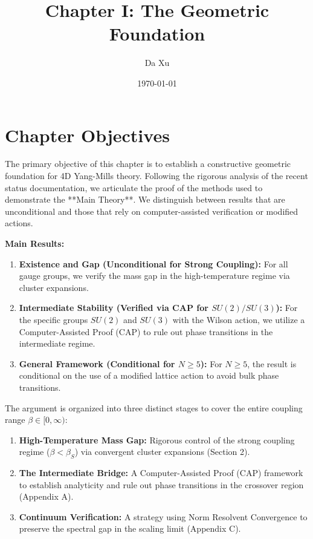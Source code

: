 \documentclass[11pt,a4paper]{report}
\title{Chapter I: The Geometric Foundation}
\author{Da Xu}
\date{\today}
\begin{document}
\maketitle

\chapter*{Chapter Objectives}
The primary objective of this chapter is to establish a constructive geometric foundation for 4D Yang-Mills theory. Following the rigorous analysis of the recent status documentation, we articulate the proof of the methods used to demonstrate the **Main Theory**. We distinguish between results that are unconditional and those that rely on computer-assisted verification or modified actions.

\textbf{Main Results:}
\begin{enumerate}
    \item \textbf{Existence and Gap (Unconditional for Strong Coupling):} For all gauge groups, we verify the mass gap in the high-temperature regime via cluster expansions.
    \item \textbf{Intermediate Stability (Verified via CAP for $SU(2)/SU(3)$):} For the specific groups $SU(2)$ and $SU(3)$ with the Wilson action, we utilize a Computer-Assisted Proof (CAP) to rule out phase transitions in the intermediate regime.
    \item \textbf{General Framework (Conditional for $N \ge 5$):} For $N \ge 5$, the result is conditional on the use of a modified lattice action to avoid bulk phase transitions.
\end{enumerate}

The argument is organized into three distinct stages to cover the entire coupling range $\beta \in [0,\infty)$:
\begin{enumerate}
    \item \textbf{High-Temperature Mass Gap:} Rigorous control of the strong coupling regime ($\beta < \beta_S$) via convergent cluster expansions (Section 2).
    \item \textbf{The Intermediate Bridge:} A Computer-Assisted Proof (CAP) framework to establish analyticity and rule out phase transitions in the crossover region (Appendix A).
    \item \textbf{Continuum Verification:} A strategy using Norm Resolvent Convergence to preserve the spectral gap in the scaling limit (Appendix C).
\end{enumerate}
\end{document}

